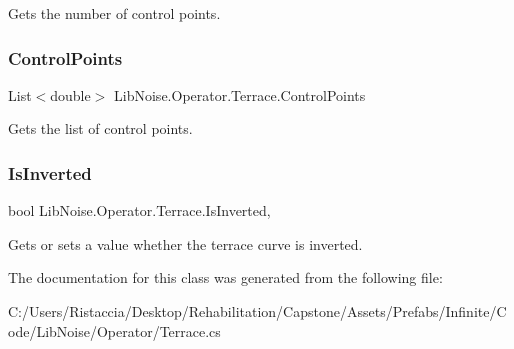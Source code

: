 Gets the number of control points. 

\mbox{\label{class_lib_noise_1_1_operator_1_1_terrace_a4daa0a62cdabfbea195b317dc012864a}} 
\subsubsection{\texorpdfstring{Control\+Points}{ControlPoints}}
{\footnotesize\ttfamily List$<$double$>$ Lib\+Noise.\+Operator.\+Terrace.\+Control\+Points\hspace{0.3cm}{\ttfamily [get]}}



Gets the list of control points. 

\mbox{\label{class_lib_noise_1_1_operator_1_1_terrace_afefcda6cc8518201f5d800bf78e8979a}} 
\subsubsection{\texorpdfstring{Is\+Inverted}{IsInverted}}
{\footnotesize\ttfamily bool Lib\+Noise.\+Operator.\+Terrace.\+Is\+Inverted\hspace{0.3cm}{\ttfamily [get]}, {\ttfamily [set]}}



Gets or sets a value whether the terrace curve is inverted. 



The documentation for this class was generated from the following file\+:\begin{DoxyCompactItemize}
\item 
C\+:/\+Users/\+Ristaccia/\+Desktop/\+Rehabilitation/\+Capstone/\+Assets/\+Prefabs/\+Infinite/\+Code/\+Lib\+Noise/\+Operator/Terrace.\+cs\end{DoxyCompactItemize}

